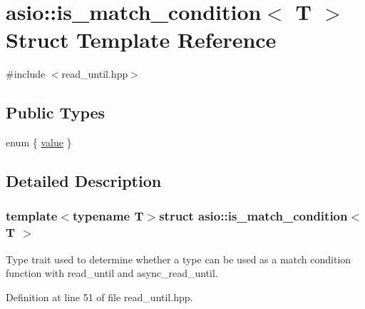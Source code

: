 \hypertarget{structasio_1_1is__match__condition}{}\section{asio\+:\+:is\+\_\+match\+\_\+condition$<$ T $>$ Struct Template Reference}
\label{structasio_1_1is__match__condition}


{\ttfamily \#include $<$read\+\_\+until.\+hpp$>$}

\subsection*{Public Types}
\begin{DoxyCompactItemize}
\item 
enum \{ \hyperlink{structasio_1_1is__match__condition_afe8389939a27ff4c6ea99aa7832102bca2aba8c96f065178b82ad75dff454778e}{value}
 \}
\end{DoxyCompactItemize}


\subsection{Detailed Description}
\subsubsection*{template$<$typename T$>$struct asio\+::is\+\_\+match\+\_\+condition$<$ T $>$}

Type trait used to determine whether a type can be used as a match condition function with read\+\_\+until and async\+\_\+read\+\_\+until. 

Definition at line 51 of file read\+\_\+until.\+hpp.



